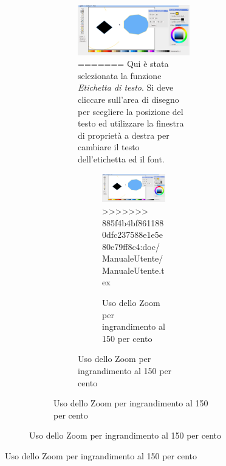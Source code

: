 \begin{figure}[!ht]
\begin{figure}[!ht]
\begin{figure}[!ht]
\begin{figure}[!ht]
\centering
\includegraphics[scale=0.4]{images/zoom_piu.png}
=======
Qui \`e stata selezionata la funzione \textit{Etichetta di testo}. Si deve cliccare sull'area di disegno per scegliere la posizione del testo ed utilizzare la finestra di propriet\`a a destra per cambiare il testo dell'etichetta ed il font.
 
\begin{figure}[!ht]
\centering
\includegraphics[scale=1]{images/zoom_piu.png}
>>>>>>> 885f4b4bf8611880dfc237588e1e5e80e79ff8c4:doc/ManualeUtente/ManualeUtente.tex
\caption{Uso dello Zoom per ingrandimento al 150 per cento}
\end{figure} 


\end{figure}
\end{figure}
\end{figure}
\end{figure}
